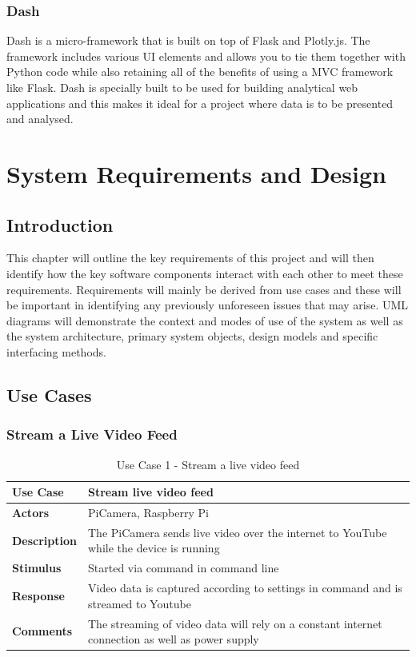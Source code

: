 \documentclass[10pt,a4paper]{article}
\begin{document}
\subsubsection{Dash}
Dash\cite{website:dash} is a micro-framework that is built on top of Flask and Plotly.js. The framework includes various UI elements and allows you to tie them together with Python code while also retaining all of the benefits of using a MVC framework like Flask. Dash is specially built to be used for building analytical web applications and this makes it ideal for a project where data is to be presented and analysed. 

\pagebreak
\section{System Requirements and Design}
\subsection{Introduction}
This chapter will outline the key requirements of this project and will then identify how the key software components interact with each other to meet these requirements. Requirements will mainly be derived from use cases and these will be important in identifying any previously unforeseen issues that may arise. UML diagrams will demonstrate the context and modes of use of the system as well as the system architecture, primary system objects, design models and specific interfacing methods. 

\subsection{Use Cases}
\subsubsection{Stream a Live Video Feed}
\begin{table}[h!]
\centering
\begin{tabular}{p{2cm}p{9cm}}
\toprule
\textbf{Use Case}    & Stream live video feed                                                                          \\ \midrule
\textbf{Actors}      & PiCamera, Raspberry Pi                                                                          \\
\textbf{Description} & The PiCamera sends live video over the internet to YouTube while the device is running         \\
\textbf{Stimulus}    & Started via command in command line                                                             \\
\textbf{Response}    & Video data is captured according to settings in command and is streamed to Youtube              \\
\textbf{Comments}    & The streaming of video data will rely on a constant internet connection as well as power supply \\ \bottomrule
\end{tabular}
\caption{Use Case 1 - Stream a live video feed}
\label{tab:useCase1}
\end{table}
\end{document}

